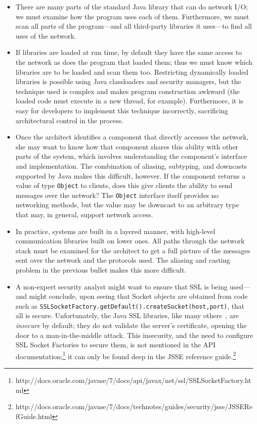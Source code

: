 \documentclass[runningheads]{llncs}
\begin{document}
\begin{sloppypar}
\begin{itemize}

\item There are many parts of the standard Java library that can do network I/O; we must examine how the program uses each of them. Furthermore, we must scan all parts of the program---and all third-party libraries it uses---to find all uses of the network.

\item If libraries are loaded at run time, by default they have the same access to the network as does the program that loaded them; thus we must know which libraries are to be loaded and scan them too.  Restricting dynamically loaded libraries is possible using Java classloaders and security managers, but the technique used is complex and makes program construction awkward (the loaded code must execute in a new thread, for example).  Furthermore, it is easy for developers to implement this technique incorrectly, sacrificing architectural control in the process.

\item Once the architect identifies a component that directly accesses the network, she may want to know how that component shares this ability with other parts of the system, which involves understanding the component's interface and implementation.  The combination of aliasing, subtyping, and downcasts supported by Java makes this difficult, however.  If the component returns a value of type \texttt{Object} to clients, does this give clients the ability to send messages over the network?  The \texttt{Object} interface itself provides no networking methods, but the value may be downcast to an arbitrary type that may, in general, support network access.

\item In practice, systems are built in a layered manner, with high-level communication libraries built on lower ones.  All paths through the network stack must be examined for the architect to get a full picture of the messages sent over the network and the protocols used.  The aliasing and casting problem in the previous bullet makes this more difficult.

\item A non-expert security analyst might want to ensure that SSL is being used---and might conclude, upon seeing that Socket objects are obtained from code such as \texttt{SSLSocketFactory.getDefault().createSocket(host,port)}, that all is secure.  Unfortunately, the Java SSL libraries, like many others~\cite{GIJABS12}, are \emph{insecure} by default; they do not validate the server's certificate, opening the door to a man-in-the-middle attack.  This insecurity, and the need to configure SSL Socket Factories to secure them, is not mentioned in the API documentation;\footnote{http://docs.oracle.com/javase/7/docs/api/javax/net/ssl/SSLSocketFactory.html} it can only be found deep in the JSSE reference guide.\footnote{http://docs.oracle.com/javase/7/docs/technotes/guides/security/jsse/JSSERefGuide.html}
\end{itemize}



\end{sloppypar}
\end{document}
